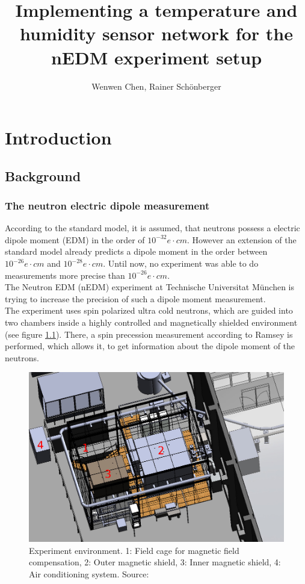 \documentclass[a4paper]{scrreprt}
\title{Implementing a temperature and humidity sensor network for the nEDM
experiment setup}
\author{Wenwen Chen, Rainer Schönberger}
\begin{document}
\maketitle
\tableofcontents
\chapter{Introduction}
\section{Background}
\subsection{The neutron electric dipole measurement}
According to the standard model, it is assumed, that neutrons possess a electric dipole moment (EDM)
in the order of $10^{-32}e\cdot cm$. However an extension of the standard model already predicts
a dipole moment in the order between $10^{-26}e\cdot cm$ and $10^{-28}e\cdot cm$. Until now, no
experiment was able to do measurements more precise than $10^{-26}e\cdot cm$\cite{frmexp}.\\
The Neutron EDM (nEDM) experiment at Technische Universitat München is trying to increase the precision
of such a dipole moment measurement\cite{frmexp}.\\
The experiment uses spin polarized ultra cold neutrons, which are guided into two chambers inside a
highly controlled and magnetically shielded environment (see figure \ref{fig:exp}). There, a spin precession measurement according
to Ramsey \cite{ramsey} is performed, which allows it, to get information about the dipole moment of the neutrons.
\begin{figure}[h]
\centering
\includegraphics[width=0.87\linewidth]{img/frm3d.jpg}
\caption{Experiment environment. 1: Field cage for magnetic field compensation, 2: Outer magnetic shield, 3: Inner magnetic shield, 4: Air conditioning system. Source: \cite{fiewiki}}
\label{fig:exp}
\end{figure}
\end{document}
